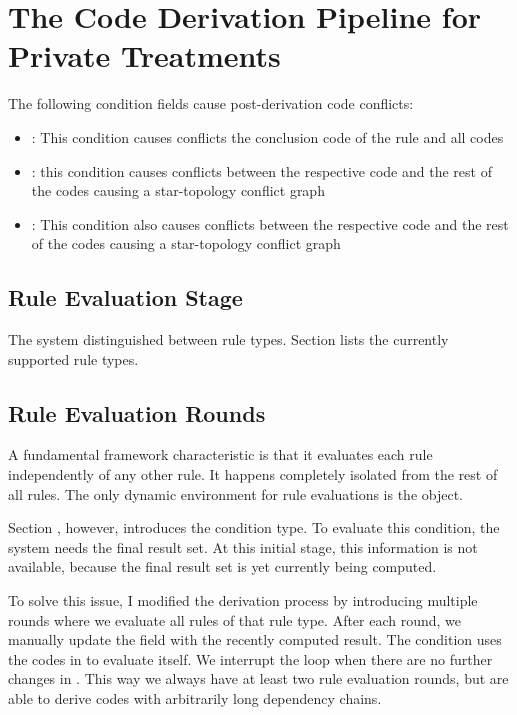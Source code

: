 \section{The Code Derivation Pipeline for Private Treatments}\label{sec:the-code-derivation-pipeline-for-private-treatments}

The following condition fields cause post-derivation code conflicts:
\begin{itemize}
    \item {}: This condition causes conflicts the conclusion code of the rule and all codes
    \item {}: this condition causes conflicts between the respective code and the rest of the codes causing a star-topology conflict graph
    \item {}: This condition also causes conflicts between the respective code and the rest of the codes causing a star-topology conflict graph
\end{itemize}

\subsection{Rule Evaluation Stage}\label{subsec:rule-evaluation-stage}

The system distinguished between rule types.
Section \addref lists the currently supported rule types.

\subsection{Rule Evaluation Rounds}\label{subsec:rule-evaluation-rounds}

A fundamental framework characteristic is that it evaluates each rule independently of any other rule.
It happens completely isolated from the rest of all rules.
The only dynamic environment for rule evaluations is the \REI object.

Section \addref, however, introduces the  condition type.
To evaluate this condition, the system needs the final result set.
At this initial stage, this information is not available, because the final result set is yet currently being computed.

To solve this issue, I modified the derivation process by introducing multiple rounds where we evaluate all rules of that rule type.
After each round, we manually update the  field with the recently computed result.
The  condition uses the codes in  to evaluate itself.
We interrupt the loop when there are no further changes in .
This way we always have at least two rule evaluation rounds, but are able to derive codes with arbitrarily long  dependency chains.

